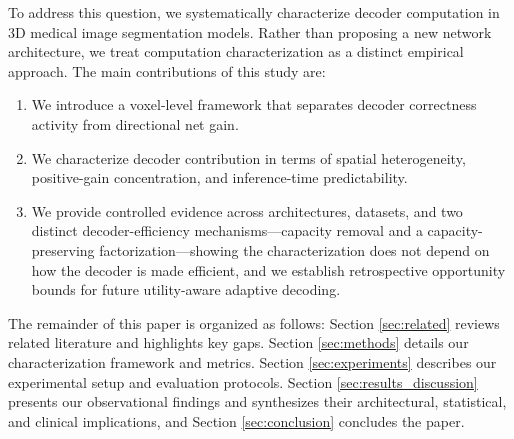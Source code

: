To address this question, we systematically characterize decoder computation in 3D medical image segmentation models. Rather than proposing a new network architecture, we treat computation characterization as a distinct empirical approach. The main contributions of this study are:
\begin{enumerate}
    \item We introduce a voxel-level framework that separates decoder correctness activity from directional net gain.
    \item We characterize decoder contribution in terms of spatial heterogeneity, positive-gain concentration, and inference-time predictability.
    \item We provide controlled evidence across architectures, datasets, and two distinct decoder-efficiency mechanisms---capacity removal and a capacity-preserving factorization---showing the characterization does not depend on how the decoder is made efficient, and we establish retrospective opportunity bounds for future utility-aware adaptive decoding.
\end{enumerate}

The remainder of this paper is organized as follows: Section \ref{sec:related} reviews related literature and highlights key gaps. Section \ref{sec:methods} details our characterization framework and metrics. Section \ref{sec:experiments} describes our experimental setup and evaluation protocols. Section \ref{sec:results_discussion} presents our observational findings and synthesizes their architectural, statistical, and clinical implications, and Section \ref{sec:conclusion} concludes the paper.
